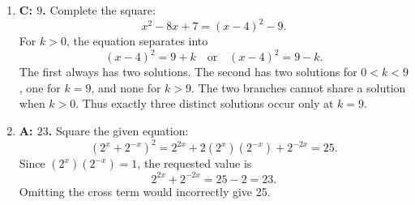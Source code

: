 \documentclass[12pt]{article}
\begin{document}
\begin{enumerate}[leftmargin=*,itemsep=1em]
  \vfill
  \item \textbf{C: $9$.} Complete the square:
  \[
    x^2-8x+7=(x-4)^2-9.
  \]
  For $k>0$, the equation separates into
  \[
    (x-4)^2=9+k
    \quad\text{or}\quad
    (x-4)^2=9-k.
  \]
  The first always has two solutions. The second has two solutions for $0<k<9$, one for $k=9$, and none for $k>9$. The two branches cannot share a solution when $k>0$. Thus exactly three distinct solutions occur only at $\boxed{k=9}$.

  \vfill
  \item \textbf{A: $23$.} Square the given equation:
  \[
    \left(2^x+2^{-x}\right)^2
    =2^{2x}+2(2^x)(2^{-x})+2^{-2x}=25.
  \]
  Since $(2^x)(2^{-x})=1$, the requested value is
  \[
    2^{2x}+2^{-2x}=25-2=\boxed{23}.
  \]
  Omitting the cross term would incorrectly give 25.
  \vfill
\end{enumerate}
\end{document}
